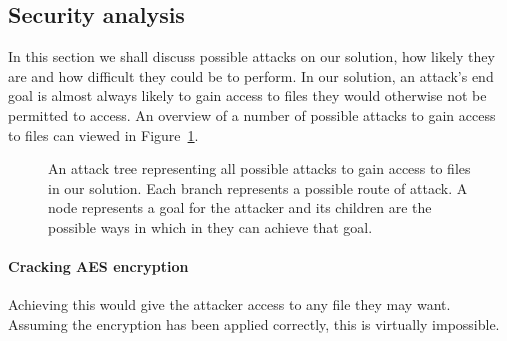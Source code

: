 \documentclass[12pt, titlepage]{article}
\begin{document}
\subsection{Security analysis}
In this section we shall discuss possible attacks on our solution, how likely they are and how difficult they could be to perform.
\newline \indent In our solution, an attack's end goal is almost always likely to gain access to files they would otherwise not be permitted to access.
\newline \indent An overview of a number of possible attacks to gain access to files can viewed in Figure~\ref{fig:attackTree}.

\begin{landscape}
\begin{figure}

\caption{An attack tree representing all possible attacks to gain access to files in our solution. Each branch represents a possible route of attack. A node represents a goal for the attacker and its children are the possible ways in which in they can achieve that goal.}
\label{fig:attackTree}
\end{figure}
\end{landscape}

\paragraph*{Cracking AES encryption} Achieving this would give the attacker access to any file they may want. Assuming the encryption has been applied correctly, this is virtually impossible.
\end{document}
